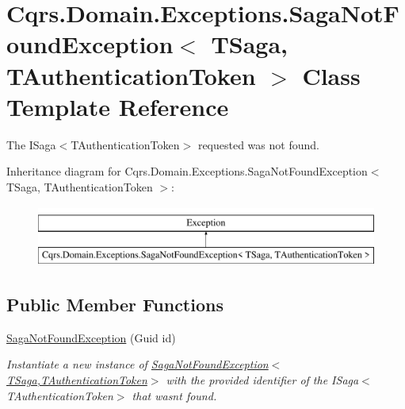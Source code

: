 \hypertarget{classCqrs_1_1Domain_1_1Exceptions_1_1SagaNotFoundException}{}\section{Cqrs.\+Domain.\+Exceptions.\+Saga\+Not\+Found\+Exception$<$ T\+Saga, T\+Authentication\+Token $>$ Class Template Reference}
\label{classCqrs_1_1Domain_1_1Exceptions_1_1SagaNotFoundException}


The I\+Saga$<$\+T\+Authentication\+Token$>$ requested was not found.  


Inheritance diagram for Cqrs.\+Domain.\+Exceptions.\+Saga\+Not\+Found\+Exception$<$ T\+Saga, T\+Authentication\+Token $>$\+:\begin{figure}[H]
\begin{center}
\leavevmode
\includegraphics[height=2.000000cm]{classCqrs_1_1Domain_1_1Exceptions_1_1SagaNotFoundException}
\end{center}
\end{figure}
\subsection*{Public Member Functions}
\begin{DoxyCompactItemize}
\item 
\hyperlink{classCqrs_1_1Domain_1_1Exceptions_1_1SagaNotFoundException_a329725b9034ccf3167b667383fb8718a_a329725b9034ccf3167b667383fb8718a}{Saga\+Not\+Found\+Exception} (Guid id)
\begin{DoxyCompactList}\small\item\em Instantiate a new instance of \hyperlink{classCqrs_1_1Domain_1_1Exceptions_1_1SagaNotFoundException_a329725b9034ccf3167b667383fb8718a_a329725b9034ccf3167b667383fb8718a}{Saga\+Not\+Found\+Exception$<$\+T\+Saga,\+T\+Authentication\+Token$>$} with the provided identifier of the I\+Saga$<$\+T\+Authentication\+Token$>$ that wasn\textquotesingle{}t found. \end{DoxyCompactList}\end{DoxyCompactItemize}
